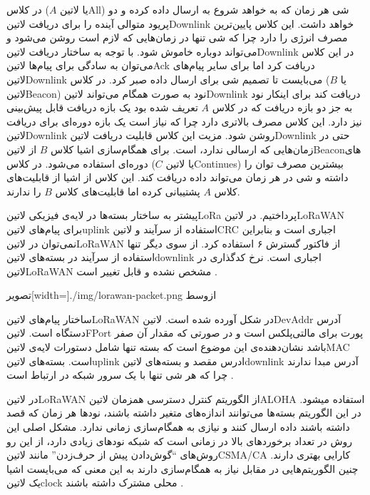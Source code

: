  در کلاس ($A$ یا ‌لاتین{All}) شی هر زمان که به خواهد شروع به ارسال داده کرده و دو پریود متوالی آینده را برای دریافت ‌لاتین{Downlink} خواهد داشت. این کلاس پایین‌ترین مصرف انرژی را دارد چرا که شی تنها در زمان‌هایی که لازم است
روشن می‌شود و می‌تواند دوباره خاموش شود. با توجه به ساختار دریافت ‌لاتین{Downlink} در این کلاس می‌توان به سادگی برای پیام‌ها ‌لاتین{Ack} دریافت کرد اما برای سایر پیام‌های ‌لاتین{Downlink} می‌بایست تا تصمیم شی برای ارسال داده صبر کرد.
 در کلاس ($B$ یا ‌لاتین{Beacon}) نود به صورت همگام می‌تواند ‌لاتین{Downlink} دریافت کند برای اینکار نود به جز دو بازه دریافت که در کلاس $A$ تعریف شده بود یک بازه دریافت قابل پیش‌بینی نیز دارد.
این کلاس مصرف بالاتری دارد چرا که نیاز است یک بازه دوره‌ای برای دریافت ‌لاتین{Downlink} روشن شود. مزیت این کلاس قابلیت دریافت ‌لاتین{Downlink} حتی در زمان‌هایی که ارسالی ندارد، است. برای همگام‌سازی اشیا کلاس $B$ از ‌لاتین{Beacon}های دوره‌ای استفاده می‌شود.
 در کلاس ($C$ یا ‌لاتین{Continues}) بیشترین مصرف توان را داشته و شی در هر زمان می‌تواند داده دریافت کند. این کلاس از اشیا از قابلیت‌های کلاس $A$ پشتیبانی کرده اما قابلیت‌های کلاس $B$ را ندارند.

پیشتر به ساختار بسته‌ها در لایه‌ی فیزیکی ‌لاتین{LoRa} پرداختیم. در ‌لاتین{LoRaWAN} برای پیام‌های ‌لاتین{uplink} استفاده از سرآیند و ‌لاتین{CRC} اجباری است
و بنابراین نمی‌توان در ‌لاتین{LoRaWAN} از فاکتور گسترش ۶ استفاده کرد. از سوی دیگر تنها استفاده از سرآیند در بسته‌های ‌لاتین{downlink} اجباری است.
نرخ کدگذاری در ‌لاتین{LoRaWAN} مشخص نشده و قابل تغییر است
.

‌تصویر[width=\textwidth]{./img/lorawan-packet.png}
‌ازوسط

ساختار پیام‌های ‌لاتین{LoRaWAN} در شکل  آورده شده است. ‌لاتین{DevAddr} آدرس دستگاه است.
‌لاتین{FPort} پورت برای مالتی‌پلکس است و در صورتی که مقدار آن صفر باشد نشان‌دهنده‌ی این موضوع است که بسته تنها شامل
دستورات لایه‌ی ‌لاتین{MAC} است. بسته‌های ‌لاتین{uplink} ادرس مقصد و بسته‌های ‌لاتین{downlink} آدرس مبدا ندارند
چرا که هر شی تنها با یک سرور شبکه در ارتباط است
.

در ‌لاتین{LoRaWAN} از الگوریتم کنترل دسترسی همزمان ‌لاتین{ALOHA} استفاده میشود. در این الگوریتم بسته‌ها می‌توانند اندازه‌های متغیر داشته باشند، نودها هر زمان که قصد داشته باشند داده ارسال کنند و نیازی به همگام‌سازی زمانی ندارد.
مشکل اصلی این روش در تعداد برخوردهای بالا در زمانی است که شبکه نودهای زیادی دارد، از این رو روش‌های ``گوش‌دادن پیش از حرف‌زدن'' مانند ‌لاتین{CSMA/CA} کارایی بهتری دارند.
چنین الگوریتم‌هایی در مقابل نیاز به همگام‌سازی دارند به این معنی که می‌بایست اشیا یک ‌لاتین{clock} محلی مشترک داشته باشند
.

